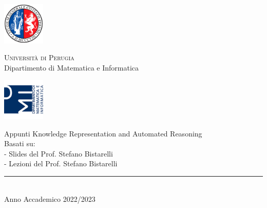 
\thispagestyle{empty} %

	\noindent %
	\includegraphics[width=0.15\textwidth]{img/logoUniPg}
	\begin{minipage}[b]{0.7\textwidth}
		\centering
		{\Large{\textsc{Universit{\`a} di Perugia}}}\\
		\vspace{0.4 em}
		{\large {Dipartimento di Matematica e Informatica}}
		\vspace{0.6 em}
	\end{minipage}%
	\includegraphics[width=0.15\textwidth]{img/logoDMI}
	
	\vspace{8 em}

	\begin{center}
		

	
		{\Huge{Appunti Knowledge Representation and Automated Reasoning }}\\
		\vspace{5 em}
		{\large {Basati su:}}\\
		{\large {- Slides del Prof. Stefano Bistarelli}}\\
		{\large {- Lezioni del Prof. Stefano Bistarelli}}\\
		
	
	

		
		\vspace{6 em}
		\vfill
		
	{\rule{380pt}{.4pt}}\\
		\vspace{1.2 em}
		\large{{Anno Accademico 2022/2023}}
		
		
		
		
	\end{center}

